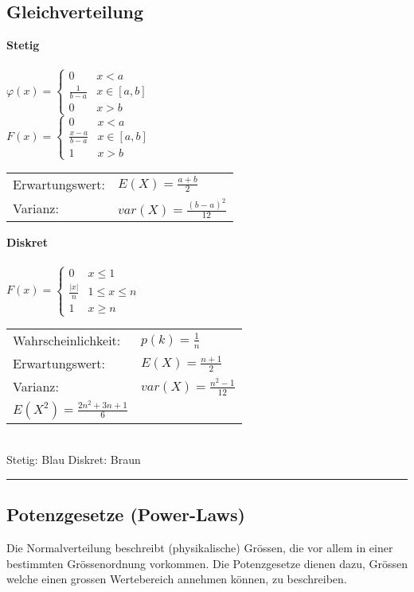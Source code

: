 \subsection{Gleichverteilung}
\begin{multicols}{3}
	\textbf{Stetig}\\ \\
	$\varphi(x) = \begin{cases}
	0 & x < a\\
	\frac{1}{b-a} & x \in [a, b]\\
	0 & x > b
	\end{cases}$ \\
	$F(x) = \begin{cases}
	0 & x < a\\
	\frac{x-a}{b-a} & x \in [a,b]\\
	1 & x > b
	\end{cases}$\\
	\begin{tabular}{ll}
		Erwartungswert: & $E(X)=\frac{a + b}{2}$\\
		Varianz:  &$var(X)=\frac{(b-a)^2}{12}$\\
	\end{tabular}
	\columnbreak
	
	\textbf{Diskret}\\ \\
	$F(x) = \begin{cases}
	0 & x \leq 1\\
	\frac{|x|}{n} & 1 \leq x \leq n \\
	1 & x \geq n
	\end{cases}$\\
	\begin{tabular}{ll}
		Wahrscheinlichkeit: & $p(k) = \frac{1}{n}$\\
		Erwartungswert: & $E(X)=\frac{n + 1}{2}$\\
		Varianz: & $var(X)=\frac{n^2-1}{12}$\\
		$E(X^2) = \frac{2n^2+3n+1}{6}$ &
	\end{tabular}
	\columnbreak
   	\\ 
	Stetig: Blau \quad Diskret: Braun
\end{multicols}
  
\hrule 
      
\subsection{Potenzgesetze (Power-Laws) \skript{\pageref{sk-potenzgesetze}}}
Die Normalverteilung beschreibt (physikalische) Grössen, die vor allem in einer bestimmten
Grössenordnung vorkommen. Die Potenzgesetze dienen dazu, Grössen welche einen grossen
Wertebereich annehmen können, zu beschreiben.
	
